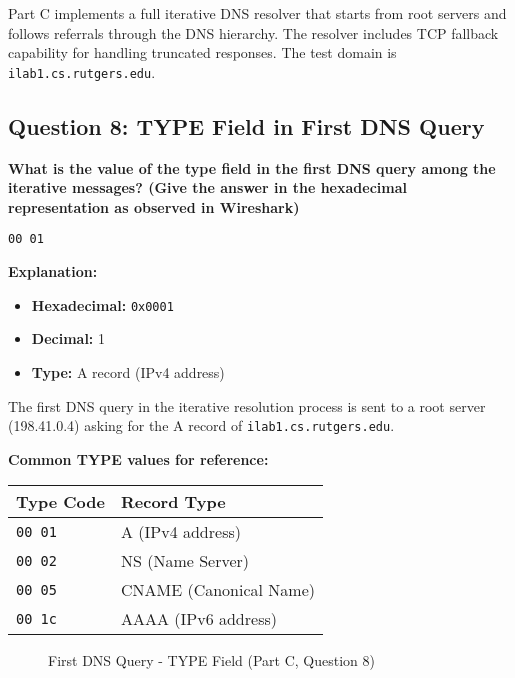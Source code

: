 \documentclass[11pt,letterpaper]{article}
\begin{document}
Part C implements a full iterative DNS resolver that starts from root servers and follows referrals through the DNS hierarchy. The resolver includes TCP fallback capability for handling truncated responses. The test domain is \texttt{ilab1.cs.rutgers.edu}.

\subsection{Question 8: TYPE Field in First DNS Query}

\textbf{What is the value of the type field in the first DNS query among the iterative messages? (Give the answer in the hexadecimal representation as observed in Wireshark)}

\begin{hexbox}
\begin{lstlisting}[style=hexstyle]
00 01
\end{lstlisting}
\end{hexbox}

\textbf{Explanation:}
\begin{itemize}
    \item \textbf{Hexadecimal:} \texttt{0x0001}
    \item \textbf{Decimal:} 1
    \item \textbf{Type:} A record (IPv4 address)
\end{itemize}

The first DNS query in the iterative resolution process is sent to a root server (198.41.0.4) asking for the A record of \texttt{ilab1.cs.rutgers.edu}.

\textbf{Common TYPE values for reference:}
\begin{center}
\begin{tabular}{ll}
\toprule
\textbf{Type Code} & \textbf{Record Type} \\
\midrule
\texttt{00 01} & A (IPv4 address) \\
\texttt{00 02} & NS (Name Server) \\
\texttt{00 05} & CNAME (Canonical Name) \\
\texttt{00 1c} & AAAA (IPv6 address) \\
\bottomrule
\end{tabular}
\end{center}

\begin{figure}[h]
    \centering
    \caption{First DNS Query - TYPE Field (Part C, Question 8)}
    \label{fig:partc_q8}
\end{figure}
\end{document}
